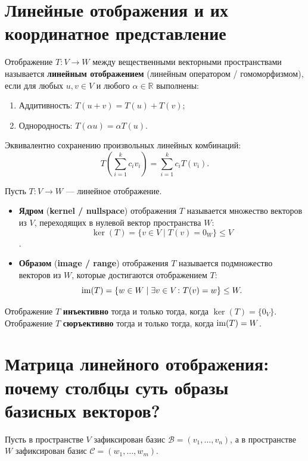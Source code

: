 \section{Линейные отображения и их координатное представление}

\begin{definition}
Отображение $T \colon V \to W$ между вещественными векторными пространствами называется \textbf{линейным отображением}
(линейным оператором / гомоморфизмом), если для любых $u, v \in V$ и любого $\alpha \in \mathbb{R}$ выполнены:
\begin{enumerate}
    \item Аддитивность: $T(u + v) = T(u) + T(v)$;
    \item Однородность: $T(\alpha u) = \alpha T(u)$.
\end{enumerate}
Эквивалентно сохранению произвольных линейных комбинаций:
\[ T\left(\sum_{i=1}^k c_i v_i\right) = \sum_{i=1}^k c_i T(v_i). \]
\end{definition}

\begin{definition}
Пусть $T \colon V \to W$ — линейное отображение.
\begin{itemize}
    \item \textbf{Ядром} (\textbf{kernel / nullspace}) отображения $T$ называется множество векторов из $V$,
    переходящих в нулевой вектор пространства $W$: \[ \ker(T) = \{ v \in V \mid T(v) = 0_W \} \le V \].
    \item \textbf{Образом} (\textbf{image / range}) отображения $T$ называется подмножество векторов из $W$, которые
    достигаются отображением $T$:
    \[ \operatorname{im}(T) = \{ w \in W \mid \exists v \in V \colon T(v) = w \} \le W. \]
\end{itemize}
Отображение $T$ \textbf{инъективно} тогда и только тогда, когда $\ker(T) = \{0_V\}$.\\ Отображение $T$
\textbf{сюръективно} тогда и только тогда, когда $\operatorname{im}(T) = W$.
\end{definition}

\section{Матрица линейного отображения: почему столбцы суть образы базисных векторов?}

Пусть в пространстве $V$ зафиксирован базис $\mathcal{B}=(v_1,\dots, v_n)$, а в пространстве $W$ зафиксирован базис
$\mathcal{C} = (w_1, \dots, w_m)$.

